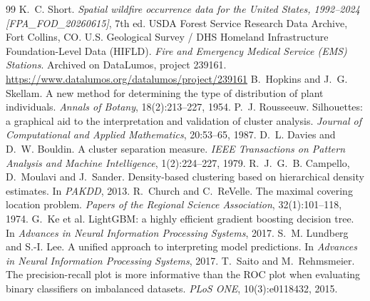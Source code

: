 \documentclass[10pt,twocolumn,letterpaper]{article}
\begin{document}
\begin{thebibliography}{99}
 K.~C. Short. \emph{Spatial wildfire occurrence data for the United States, 1992--2024 [FPA\_FOD\_20260615]}, 7th ed. USDA Forest Service Research Data Archive, Fort Collins, CO.
 U.S. Geological Survey / DHS Homeland Infrastructure Foundation-Level Data (HIFLD). \emph{Fire and Emergency Medical Service (EMS) Stations}. Archived on DataLumos, project 239161. \url{https://www.datalumos.org/datalumos/project/239161}
 B.~Hopkins and J.~G. Skellam. A new method for determining the type of distribution of plant individuals. \emph{Annals of Botany}, 18(2):213--227, 1954.
 P.~J. Rousseeuw. Silhouettes: a graphical aid to the interpretation and validation of cluster analysis. \emph{Journal of Computational and Applied Mathematics}, 20:53--65, 1987.
 D.~L. Davies and D.~W. Bouldin. A cluster separation measure. \emph{IEEE Transactions on Pattern Analysis and Machine Intelligence}, 1(2):224--227, 1979.
 R.~J.~G.~B. Campello, D.~Moulavi and J.~Sander. Density-based clustering based on hierarchical density estimates. In \emph{PAKDD}, 2013.
 R.~Church and C.~ReVelle. The maximal covering location problem. \emph{Papers of the Regional Science Association}, 32(1):101--118, 1974.
 G.~Ke et al. LightGBM: a highly efficient gradient boosting decision tree. In \emph{Advances in Neural Information Processing Systems}, 2017.
 S.~M. Lundberg and S.-I. Lee. A unified approach to interpreting model predictions. In \emph{Advances in Neural Information Processing Systems}, 2017.
 T.~Saito and M.~Rehmsmeier. The precision-recall plot is more informative than the ROC plot when evaluating binary classifiers on imbalanced datasets. \emph{PLoS ONE}, 10(3):e0118432, 2015.
\end{thebibliography}
\end{document}
